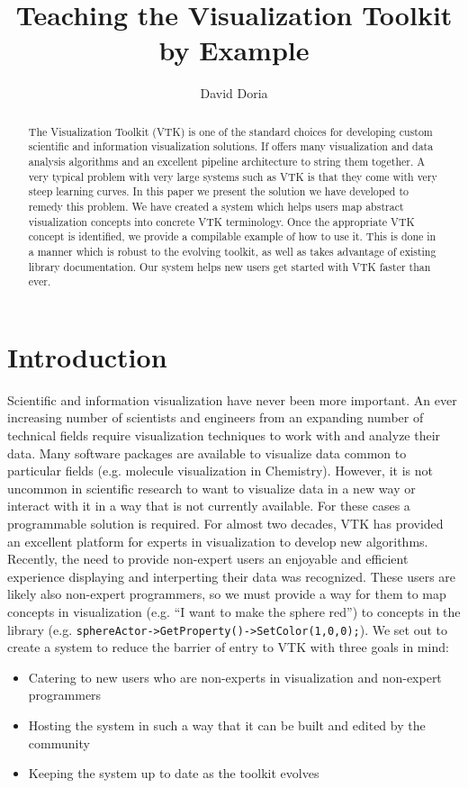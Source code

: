 \documentclass[a4paper,10pt]{IEEEtran}
\title{Teaching the Visualization Toolkit by Example}
\author{David Doria}
\begin{document}
\maketitle

\begin{abstract}
The Visualization Toolkit (VTK) is one of the standard choices for developing custom scientific and information visualization solutions. If offers many visualization and data analysis algorithms and an excellent pipeline architecture to string them together. A very typical problem with very large systems such as VTK is that they come with very steep learning curves. In this paper we present the solution we have developed to remedy this problem. We have created a system which helps users map abstract visualization concepts into concrete VTK terminology. Once the appropriate VTK concept is identified, we provide a compilable example of how to use it. This is done in a manner which is robust to the evolving toolkit, as well as takes advantage of existing library documentation. Our system helps new users get started with VTK faster than ever.
\end{abstract}


\section{Introduction}
Scientific and information visualization have never been more important. An ever increasing number of scientists and engineers from an expanding number of technical fields require visualization techniques to work with and analyze their data. Many software packages are available to visualize data common to particular fields (e.g. molecule visualization in Chemistry). However, it is not uncommon in scientific research to want to visualize data in a new way or interact with it in a way that is not currently available. For these cases a programmable solution is required. For almost two decades, VTK has provided an excellent platform for experts in visualization to develop new algorithms. Recently, the need to provide non-expert users an enjoyable and efficient experience displaying and interperting their data was recognized. These users are likely also non-expert programmers, so we must provide a way for them to map concepts in visualization (e.g. ``I want to make the sphere red'') to concepts in the library (e.g. \verb|sphereActor->GetProperty()->SetColor(1,0,0);|). We set out to create a system to reduce the barrier of entry to VTK with three goals in mind:
\begin{itemize}
 \item Catering to new users who are non-experts in visualization and non-expert programmers
 \item Hosting the system in such a way that it can be built and edited by the community
 \item Keeping the system up to date as the toolkit evolves
\end{itemize}
\end{document}
